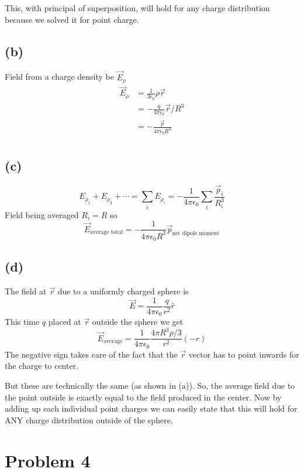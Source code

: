 \documentclass[letter, 10pts]{article}
\begin{document}
This, with principal of superposition, will hold for any charge distribution because we solved it for point charge. 


\subsection*{(b)} 
Field from a charge density be $\vec{E}_\rho$ 
\begin{align*}
\vec{E}_\rho &= \frac{1}{3 \epsilon_0} \rho \vec{r}  \\
&= - \frac{q}{4 \pi \epsilon_0} \vec{r}/R^3 \\
&= - \frac{\vec{p}}{4 \pi \epsilon_0 R^3} \\
\end{align*}


\subsection*{(c)} 
\[
E_\rho_1 + E_\rho_2 + \cdots = \sum_{i}^{} E_\rho_i = - \frac{1}{4 \pi \epsilon_0 }  \sum_{i}^{} \frac{\vec{p}_i}{R^3_i}
\] 
Field being averaged $R_i = R$ so 
\[
	\vec{E}_\text{average total} = - \frac{1}{4 \pi \epsilon_0 R^3}  \vec{p}_{\text{net dipole moment}} 
\] 
\subsection*{(d)} 
The field at $\vec{r}$ due to a uniformly charged sphere is 
\[
\vec{E} = \frac{1}{4 \pi \epsilon_0} \frac{q}{r^2} \hat{r} 
\] 
This time $q$ placed at $\vec{r}$ outside the sphere we get
\[
	\vec{E}_{\text{average}} = \frac{1}{4 \pi \epsilon_0} \frac{4 \pi R^3 \rho / 3}{r^2} (-\hat{r}) 
\] 
The negative sign takes care of the fact that the $\vec{r}$ vector has to point inwards for the charge to center. 

But these are technically the same (as shown in (a)). So, the average field due to the point outside is exactly equal to the field produced in the center. Now by adding up each individual point charges we can easily state that this will hold for ANY charge distribution outside of the sphere. 






\section*{Problem 4} 
\end{document}
